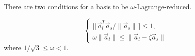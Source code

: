 There are two conditions for a basis to be $\omega$-Lagrange-reduced.

\[
\begin{cases}
|\lfloor \vec{a}_l^T \vec{a}_s / \|\vec{a}_s \| \rceil \leq 1,\\
\omega \| \vec{a}_l \| \leq \|\vec{a}_l - \zeta \vec{a}_s\|
\end{cases}
\]  where $1/\sqrt{3} \leq \omega < 1$.
